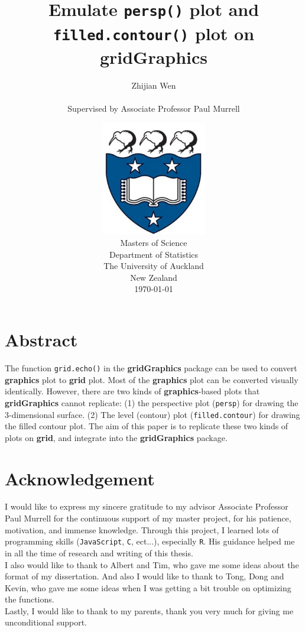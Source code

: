 \documentclass[11pt,twoside]{report}
\title{\huge{Emulate \texttt{persp()} plot and \texttt{filled.contour()} plot on \textbf{gridGraphics}}}
\author{\Large{Zhijian Wen} \\ \\ \Large{Supervised by Associate Professor Paul Murrell}}
\date
{
\vspace{3cm}
\includegraphics[height = 5cm, width = 5cm]{logo.jpg}\\
\vspace{1cm}
Masters of Science\\
Department of Statistics\\
The University of Auckland\\
New Zealand\\
\today\\
}
\begin{document}

\setlength{\parindent}{1pt}
\noindent

\maketitle

\newpage



\newpage
\pagebreak
\hspace{0pt}
\vfill
\section*{Abstract}
The function \texttt{grid.echo()} in the \textbf{gridGraphics} package can be used to convert \textbf{graphics} plot to \textbf{grid} plot. Most of the \textbf{graphics} plot can be converted visually identically. However, there are two kinds of \textbf{graphics}-based plots that \textbf{gridGraphics} cannot replicate: (1) the perspective plot (\texttt{persp}) for drawing the 3-dimensional surface. (2) The level (contour) plot (\texttt{filled.contour}) for drawing the filled contour plot. The aim of this paper is to replicate these two kinds of plots on \textbf{grid}, and integrate into the \textbf{gridGraphics} package.
\vfill
\hspace{0pt}
\pagebreak

\newpage
\pagebreak
\hspace{0pt}
\vfill
\section*{Acknowledgement}
I would like to express my sincere gratitude to my advisor Associate Professor Paul Murrell for the continuous support of my master project, for his patience, motivation, and immense knowledge. Through this project, I learned lots of programming skills (\texttt{JavaScript}, \texttt{C}, ect...), especially \texttt{R}. His guidance helped me in all the time of research and writing of this thesis.\\

I also would like to thank to Albert and Tim, who gave me some ideas about the format of my dissertation. And also I would like to thank to Tong, Dong and Kevin, who gave me some ideas when I was getting a bit trouble on optimizing the functions.\\

Lastly, I would like to thank to my parents, thank you very much for giving me unconditional support. 
\vfill
\hspace{0pt}
\pagebreak
\end{document}
